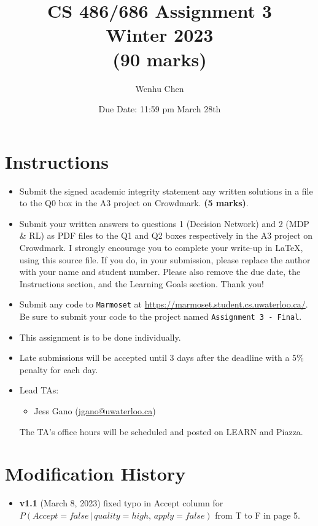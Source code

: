 \documentclass[12pt]{article}
\title{CS 486/686 Assignment 3 \\ Winter 2023 \\ (90 marks) }
\author{Wenhu Chen}
\date{Due Date: 11:59 pm March 28th}
\begin{document}
\maketitle

\section*{Instructions}

\begin{itemize}
\item
Submit the signed academic integrity statement any written solutions in a file to the Q0 box in the A3 project on Crowdmark. \textbf{(5 marks)}.

\item Submit your written answers to questions 1 (Decision Network) and 2 (MDP \& RL) as PDF files to the Q1 and Q2 boxes respectively in the A3 project on Crowdmark. I strongly encourage you to complete your write-up in LaTeX, using this source file. If you do, in your submission, please replace the author with your name and student number. Please also remove the due date, the Instructions section, and the Learning Goals section. Thank you!

\item Submit any code to \verb+Marmoset+ at \url{https://marmoset.student.cs.uwaterloo.ca/}. Be sure to submit your code to the project named \texttt{Assignment 3 - Final}. 

\item
This assignment is to be done individually.

\item
Late submissions will be accepted until 3 days after the deadline with a 5\% penalty for each day.

\item
Lead TAs: 
\begin{itemize}
\item 
Jess Gano (\url{jgano@uwaterloo.ca})
\end{itemize}
The TA's office hours will be scheduled and posted on LEARN and Piazza.
\end{itemize}

\newpage
\section*{Modification History}
\begin{itemize}
    \item \textbf{v1.1} (March 8, 2023) fixed typo in Accept column for $P(Accept=false\, |\, quality = high,\, apply = false)$ from T to F in page 5.
\end{itemize}
\end{document}
